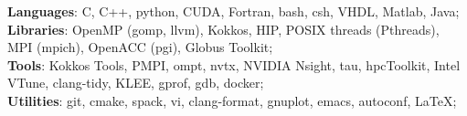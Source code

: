 {{\bf Languages}: C, C++, python, CUDA, Fortran, bash, csh, VHDL, Matlab, Java};\\
{{\bf Libraries}:  OpenMP (gomp, llvm), Kokkos, HIP, POSIX threads (Pthreads), MPI (mpich), OpenACC (pgi), Globus Toolkit}; \\
{{\bf Tools}: Kokkos Tools, PMPI, ompt, nvtx, NVIDIA Nsight, tau, hpcToolkit, Intel VTune, clang-tidy, KLEE,  gprof, gdb, docker}; \\
{{\bf Utilities}: git, cmake, spack, vi, clang-format, gnuplot, emacs, autoconf, LaTeX};\\

